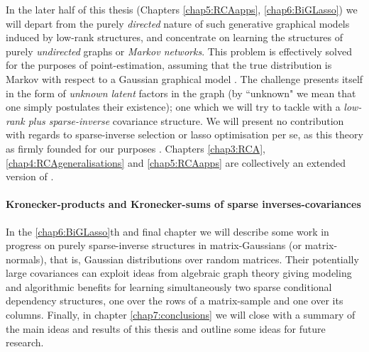  In the later half of this thesis (Chapters \ref{chap5:RCAapps}, \ref{chap6:BiGLasso}) we will depart from the purely \emph{directed} nature of such generative graphical models induced by low-rank structures, and concentrate on learning the structures of purely \emph{undirected} graphs or \emph{Markov networks}.
  This problem is effectively solved for the purposes of point-estimation, assuming that the true distribution is Markov with respect to a Gaussian graphical model \citep{Friedman:sparse08, Banerjee:model2008}.
  The challenge presents itself in the form of \emph{unknown latent} factors in the graph (by ``unknown" we mean that one simply postulates their existence); one which we will try to tackle with a \emph{low-rank plus sparse-inverse} covariance structure.
  We will present no contribution with regards to sparse-inverse selection or lasso optimisation per se, as this theory as firmly founded for our purposes \citep{Tibshirani:Lasso96}.    
  Chapters \ref{chap3:RCA},\ref{chap4:RCAgeneralisations} and \ref{chap5:RCAapps} are collectively an extended version of \citep{Kalaitzis:rca12, Kalaitzis:rca11}.

  \paragraph{Kronecker-products and Kronecker-sums of sparse inverses-covariances}
  In the \ref{chap6:BiGLasso}th and final chapter we will describe some work in progress on purely sparse-inverse structures in matrix-Gaussians (or matrix-normals), that is, Gaussian distributions over random matrices. Their potentially large covariances can exploit ideas from algebraic graph theory giving modeling and algorithmic benefits for learning simultaneously two sparse conditional dependency structures, one over the rows of a matrix-sample and one over its columns.
  Finally, in chapter \ref{chap7:conclusions} we will close with a summary of the main ideas and results of this thesis and outline some ideas for future research.



      
